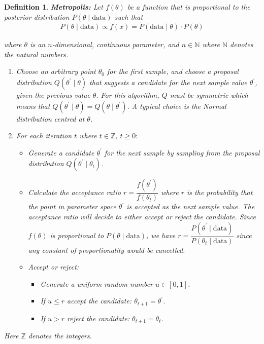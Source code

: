 \documentclass[12pt,twoside]{report}   %
\newcommand{\bb}{\textbf}
\newcommand{\N}{\mathbb{N}}
\newcommand{\p}{\prime}
\newtheorem{definition}[theorem]{Definition}
\begin{document}
\vspace{7pt}
\begin{definition}\label{Metropolis Def}
\bb{Metropolis:} Let $f(\theta)$ be a function that is proportional to the posterior distribution $P(\theta\mid \text{data})$ such that
\begin{align*}
P(\theta\mid \text{data}) \propto f(x) = P(\text{data}\mid \theta)\cdot P(\theta)
\end{align*}

where $\theta$ is an $n$-dimensional, continuous parameter, and $n\in\N$ where $\N$ denotes the natural numbers.
\begin{enumerate}
\item Choose an arbitrary point $\theta_0$ for the first sample, and choose a proposal distribution $Q(\theta^\p\mid\theta)$ that suggests a candidate for the next sample value $\theta^\p$, given the previous value $\theta$. For this algorithm, $Q$ must be symmetric which means that \newline$Q(\theta^\p\mid\theta) = Q(\theta\mid\theta^\p)$. A typical choice is the Normal distribution centred at $\theta$.
\item For each iteration $t$ where $t\in\mathbb{Z}$, $t\geq 0:$
\begin{itemize}
\item Generate a candidate $\theta^\p$ for the next sample by sampling from the proposal distribution $Q(\theta^\p\mid \theta_t)$.
\item Calculate the acceptance ratio $r = \dfrac{f(\theta^\p)}{f(\theta_t)}$ where $r$ is the probability that the point in parameter space $\theta^\p$ is accepted as the next sample value. The acceptance ratio will decide to either accept or reject the candidate. Since $f(\theta)$ is proportional to $P(\theta\mid\text{data})$, we have $r = \dfrac{P(\theta^\p\mid\text{data})}{P(\theta_t\mid\text{data})}$ since any constant of proportionality would be cancelled.
\item Accept or reject:
\begin{itemize}
\item Generate a uniform random number $u\in[0,1]$.
\item If $u\leq r$ accept the candidate: $\theta_{t+1} = \theta^\p$.
\item If $u> r$ reject the candidate: $\theta_{t+1} = \theta_t$.
\end{itemize}
\end{itemize}
\end{enumerate}
Here $\mathbb{Z}$ denotes the integers.
\end{definition}
\end{document}
